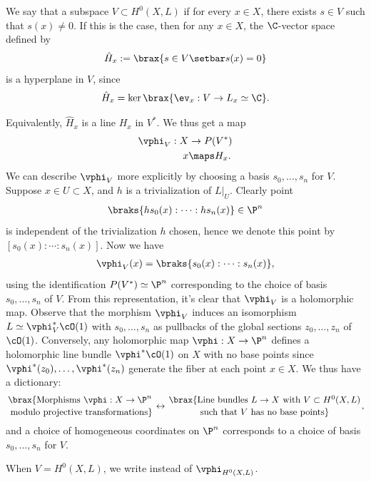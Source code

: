 \documentclass[11pt]{report}
\begin{document}
\begin{defn}
We say that a subspace $V \subset H^0(X,L)$  if for every $x \in X$, there exists $s \in V$ such that $s(x) \ne 0$. If this is the case, then for any $x \in X$, the $\C$-vector space  defined by
\begin{align*}
\hat H_x := \brax{s \in V \setbar s(x) = 0}
\end{align*}
is a hyperplane in $V$, since
\begin{align*}
\hat H_x = \ker \brax{\ev _x:V \to L_x \simeq \C}.
\end{align*}
\end{defn}
Equivalently, $\hat H_x$ is a line $H_x$ in $V^*$. We thus get a map
\begin{align*}
\vphi_V : X &\to P(V^*) \\
x & \maps H_x.
\end{align*}
We can describe $\vphi_V$ more explicitly by choosing a basis $s_0,\dots,s_n$ for $V$. Suppose $x \in U \subset X$, and $h$ is a trivialization of $L|_U$. Clearly point
\begin{align*}
\braks{h s_0(x):\cdots : hs_n(x)} \in \P^n
\end{align*}
is independent of the trivialization $h$ chosen, hence we denote this point by $[s_0(x):\cdots :s_n(x)]$. Now we have 
\begin{align*}
\vphi_V(x) = \braks{s_0(x):\cdots : s_n(x)},
\end{align*}
using the identification $P(V^*)\simeq \P^n$ corresponding to the choice of basis $s_0,\dots,s_n$ of $V$. From this representation, it's clear that $\vphi_V$ is a holomorphic map. Observe that the morphism $\vphi_V$ induces an isomorphism $L \simeq \vphi_V^* \cO(1)$ with $s_0,\dots,s_n$ as pullbacks of the global sections $z_0,\dots,z_n$ of $\cO(1)$. Conversely, any holomorphic map $\vphi:X \to \P^n$ defines a holomorphic line bundle $\vphi^* \cO(1)$ on $X$ with no base points since $\vphi^*(z_0),\dots,\vphi^*(z_n)$ generate the fiber at each point $x\in X$. We thus have a dictionary:
\begin{align*}
\brax{\text{Morphisms } \vphi:X \to \P^n \atop \text{ modulo projective transformations} } \leftrightarrow \brax{\text{Line bundles } L\to X \text{ with } V \subset H^0(X,L) \atop \text{such that } V \text{ has no base points} },
\end{align*}
and a choice of homogeneous coordinates on $\P^n$ corresponds to a choice of basis $s_0,\dots,s_n$ for $V$. 
\begin{defn}
When $V = H^0(X,L)$, we write  instead of $\vphi_{H^0(X,L)}$.
\end{defn}
\end{document}
